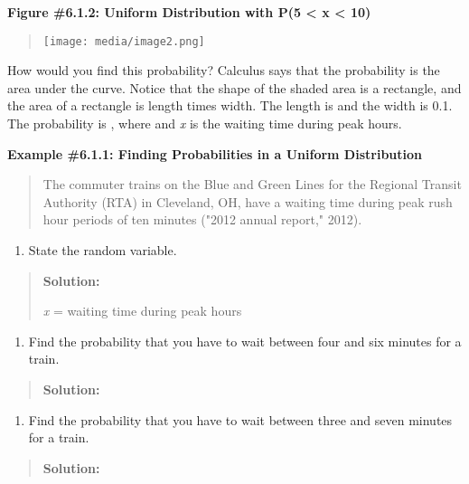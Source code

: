 \documentclass[]{book}
\providecommand{\tightlist}{%
  \setlength{\itemsep}{0pt}\setlength{\parskip}{0pt}}
\begin{document}
\textbf{Figure \#6.1.2: Uniform Distribution with P(5 \textless{} x \textless{} 10)}

\begin{quote}
\texttt{[image: media/image2.png]}
\end{quote}

How would you find this probability? Calculus says that the probability is the area under the curve. Notice that the shape of the shaded area is a rectangle, and the area of a rectangle is length times width. The length is and the width is 0.1. The probability is , where and \emph{x} is the waiting time during peak hours.

\textbf{Example \#6.1.1: Finding Probabilities in a Uniform Distribution}

\begin{quote}
The commuter trains on the Blue and Green Lines for the Regional Transit Authority (RTA) in Cleveland, OH, have a waiting time during peak rush hour periods of ten minutes ("2012 annual report," 2012).
\end{quote}

\begin{enumerate}
\def\labelenumi{\alph{enumi}.}
\tightlist
\item
  State the random variable.
\end{enumerate}

\begin{quote}
\textbf{Solution:}

\emph{x} = waiting time during peak hours
\end{quote}

\begin{enumerate}
\def\labelenumi{\alph{enumi}.}
\setcounter{enumi}{1}
\tightlist
\item
  Find the probability that you have to wait between four and six
  minutes for a train.
\end{enumerate}

\begin{quote}
\textbf{Solution:}
\end{quote}

\begin{enumerate}
\def\labelenumi{\alph{enumi}.}
\setcounter{enumi}{2}
\tightlist
\item
  Find the probability that you have to wait between three and seven
  minutes for a train.
\end{enumerate}

\begin{quote}
\textbf{Solution:}
\end{quote}
\end{document}

